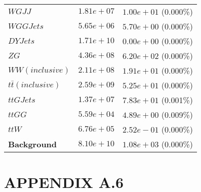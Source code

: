 \begin{table}[h!]
\begin{tabular}{ |l|c|c| }
                                    $WGJJ$ &  $1.81e+07$  &  $1.00e+01$ (0.000\%) \\
                                 $WGGJets$ &  $5.65e+06$  &  $5.70e+00$ (0.000\%) \\
                                  $DYJets$ &  $1.71e+10$  &  $0.00e+00$ (0.000\%) \\
                                      $ZG$ &  $4.36e+08$  &  $6.20e+02$ (0.000\%) \\
                           $WW(inclusive)$ &  $2.11e+08$  &  $1.91e+01$ (0.000\%) \\
                    $t\bar{t} (inclusive)$ &  $2.59e+09$  &  $5.25e+01$ (0.000\%) \\
                                 $ttGJets$ &  $1.37e+07$  &  $7.83e+01$ (0.001\%) \\
                                    $ttGG$ &  $5.59e+04$  &  $4.89e+00$ (0.009\%) \\
                                     $ttW$ &  $6.76e+05$  &  $2.52e-01$ (0.000\%) \\
                       \textbf{Background} &  $8.10e+10$  &  $1.08e+03$ (0.000\%) \\
    \hline
\end{tabular}
\label{fullyleptonic-cutflow}
\end{table}


\section*{APPENDIX A.6}

